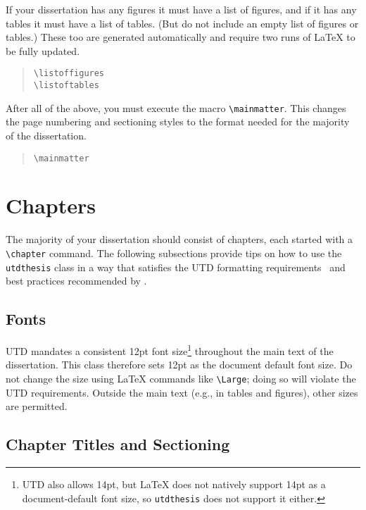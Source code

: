 \documentclass[doublespacing]{utdthesis}
\let\cite=\citep
\newenvironment{exampleclasscode}
 {\parindent=1cm\begin{verse}}
 {\end{verse}}
\begin{document}
If your dissertation has any figures it must have a list of figures, and if it
has any tables it must have a list of tables.
(But do not include an empty list of figures or tables.)
These too are generated automatically and require two runs of \LaTeX{} to be
fully updated.
\begin{exampleclasscode}
\verb|\listoffigures| \\
\verb|\listoftables|
\end{exampleclasscode}

After all of the above, you must execute the macro \verb|\mainmatter|.
This changes the page numbering and sectioning styles to the format needed for
the majority of the dissertation.
\begin{exampleclasscode}
\verb|\mainmatter|
\end{exampleclasscode}

\section{Chapters}
\label{s:chapters}

The majority of your dissertation should consist of chapters, each started
with a \verb|\chapter| command.
The following subsections provide tips on how to use the \texttt{utdthesis}
class in a way that satisfies the UTD formatting requirements~\cite{utdguide}
and best practices recommended by \citet{turabian}.

\subsection{Fonts}
\label{s:fonts}

UTD mandates a consistent 12pt font size\footnote{%
  UTD also allows 14pt, but \LaTeX{} does not natively support 14pt as a
  document-default font size, so \texttt{utdthesis} does not support it
  either.}
throughout the main text of the dissertation.
This class therefore sets 12pt as the document default font size.
Do not change the size using \LaTeX{} commands like \verb|\Large|;
doing so will violate the UTD requirements.
Outside the main text (e.g., in tables and figures), other sizes are permitted.

\subsection{Chapter Titles and Sectioning}
\label{s:sect}
\end{document}
